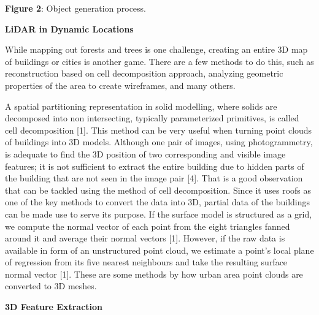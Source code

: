 \documentclass[12pt]{report}
\begin{document}
\begin{Center}
 [5]
\end{Center}\par

\begin{Center}
\textbf{Figure 2}: Object generation process.
\end{Center}\par


\vspace{\baselineskip}
\textbf{LiDAR in Dynamic Locations}\par


\vspace{\baselineskip}
While mapping out forests and trees is one challenge, creating an entire 3D map of buildings or cities is another game. There are a few methods to do this, such as reconstruction based on cell decomposition approach, analyzing geometric properties of the area to create wireframes, and many others.\par


\vspace{\baselineskip}
A spatial partitioning representation in solid modelling, where solids are decomposed into non intersecting, typically parameterized primitives, is called cell decomposition [1]. This method can be very useful when turning point clouds of buildings into 3D models. Although one pair of images, using photogrammetry, is adequate to find the 3D position of two corresponding and visible image features; it is not sufficient to extract the entire building due to hidden parts of the building that are not seen in the image pair [4]. That is a good observation that can be tackled using the method of cell decomposition. Since it uses roofs as one of the key methods to convert the data into 3D, partial data of the buildings can be made use to serve its purpose. If the surface model is structured as a grid, we compute the normal vector of each point from the eight triangles fanned around it and average their normal vectors [1]. However, if the raw data is available in form of an unstructured point cloud, we estimate a point’s local plane of regression from its five nearest neighbours and take the resulting surface normal vector [1]. These are some methods by how urban area point clouds are converted to 3D meshes.\par


\vspace{\baselineskip}

\vspace{\baselineskip}
\textbf{3D Feature Extraction}\par
\end{document}
